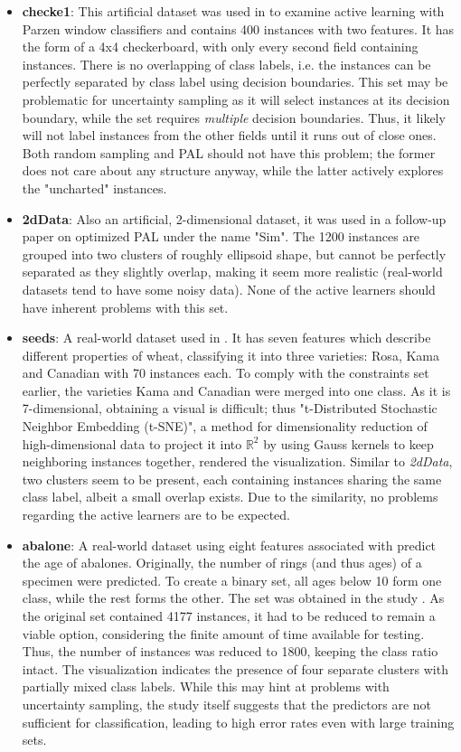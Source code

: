 \begin{itemize}
	\item \textbf{checke1}: This artificial dataset was used in \cite{Chapelle2005} to examine active learning with Parzen window classifiers and contains 400 instances with two features. It has the form of a 4x4 checkerboard, with only every second field containing instances. There is no overlapping of class labels, i.e. the instances can be perfectly separated by class label using decision boundaries. This set may be problematic for uncertainty sampling as it will select instances at its decision boundary, while the set requires \textit{multiple} decision boundaries. Thus, it likely will not label instances from the other fields until it runs out of close ones. Both random sampling and PAL should not have this problem; the former does not care about any structure anyway, while the latter actively explores the "uncharted" instances.
	\item \textbf{2dData}: Also an artificial, 2-dimensional dataset, it was used in a follow-up paper on optimized PAL \cite{KremplEtAl2015} under the name "Sim". The 1200 instances are grouped into two clusters of roughly ellipsoid shape, but cannot be perfectly separated as they slightly overlap, making it seem more realistic (real-world datasets tend to have some noisy data). None of the active learners should have inherent problems with this set.
	\item \textbf{seeds}: A real-world dataset used in \cite{CharytanowiczEtAl2010}. It has seven features which describe different properties of wheat, classifying it into three varieties: Rosa, Kama and Canadian with 70 instances each. To comply with the constraints set earlier, the varieties Kama and Canadian were merged into one class. As it is 7-dimensional, obtaining a visual is difficult; thus "t-Distributed Stochastic Neighbor Embedding (t-SNE)", a method for dimensionality reduction of high-dimensional data \cite{vanDerMaaten2008} to project it into $\mathbb{R}^2$ by using Gauss kernels to keep neighboring instances together, rendered the visualization. Similar to \textit{2dData}, two clusters seem to be present, each containing instances sharing the same class label, albeit a small overlap exists. Due to the similarity, no problems regarding the active learners are to be expected.
	\item \textbf{abalone}: A real-world dataset using eight features associated with predict the age of abalones. Originally, the number of rings (and thus ages) of a specimen were predicted. To create a binary set, all ages below 10 form one class, while the rest forms the other. The set was obtained in the study \cite{NashEtAl1994}. As the original set contained 4177 instances, it had to be reduced to remain a viable option, considering the finite amount of time available for testing. Thus, the number of instances was reduced to 1800, keeping the class ratio intact. The visualization indicates the presence of four separate clusters with partially mixed class labels. While this may hint at problems with uncertainty sampling, the study itself suggests that the predictors are not sufficient for classification, leading to high error rates even with large training sets.
\end{itemize}

